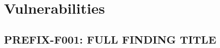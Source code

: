 \documentclass[11pt,a4paper]{article}
\newcommand{\ph}[1]{\lbrack#1\rbrack}
\begin{document}
\section{Vulnerabilities}


\subsection{\ph{PREFIX}-F001: \ph{FULL FINDING TITLE}}
\label{sec:f001}

%
\end{document}
